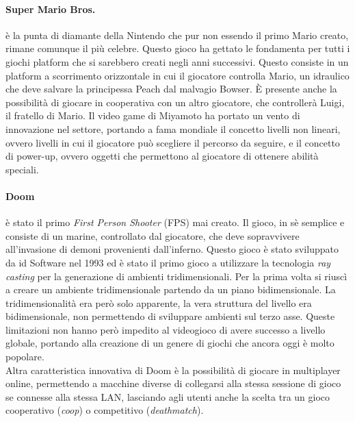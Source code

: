         \paragraph{Super Mario Bros.} è la punta di diamante della Nintendo che pur non essendo il primo Mario creato, rimane comunque il più celebre. Questo gioco ha gettato le fondamenta
            per tutti i giochi platform che si sarebbero creati negli anni successivi. Questo consiste in un platform a scorrimento orizzontale in cui il giocatore controlla Mario, 
            un idraulico che deve salvare la principessa Peach dal malvagio Bowser. È presente anche la possibilità di giocare in cooperativa con un altro giocatore, che controllerà
            Luigi, il fratello di Mario. Il video game di Miyamoto ha portato un vento di innovazione nel settore, portando a fama mondiale il concetto livelli non lineari, ovvero
            livelli in cui il giocatore può scegliere il percorso da seguire, e il concetto di power-up, ovvero oggetti che permettono al giocatore di ottenere abilità speciali.\cite{ryan2011}
            
        \paragraph{Doom} è stato il primo \textit{First Person Shooter} (FPS) mai creato. Il gioco, in sè semplice e consiste di un marine, controllato dal giocatore, che deve sopravvivere
            all'invasione di demoni provenienti dall'inferno. Questo gioco è stato sviluppato da id Software nel 1993 ed è stato il primo gioco a utilizzare la tecnologia \textit{ray casting} 
            per la generazione di ambienti tridimensionali. Per la prima volta si riuscì a creare un ambiente tridimensionale partendo da un piano bidimensionale. La tridimensionalità era
            però solo apparente, la vera struttura del livello era bidimensionale, non permettendo di sviluppare ambienti sul terzo asse. Queste limitazioni non hanno
            però impedito al videogioco di avere successo a livello globale, portando alla creazione di un genere di giochi che ancora oggi è molto popolare.\\
            Altra caratteristica innovativa di Doom è la possibilità di giocare in multiplayer online, permettendo a macchine diverse di collegarsi alla stessa sessione di gioco
            se connesse alla stessa LAN, lasciando agli utenti anche la scelta tra un gioco cooperativo (\textit{coop}) o competitivo (\textit{deathmatch}).
        
